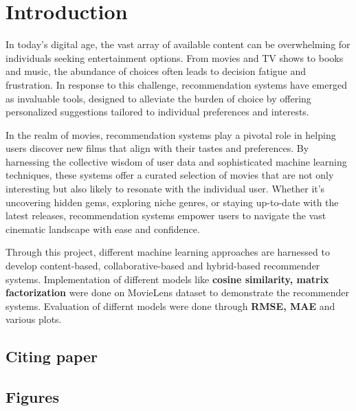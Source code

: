 \documentclass[a4paper]{article}
\theoremstyle{plain}
\theoremstyle{definition}
\begin{document}
	\section{\LARGE Introduction}
	{ \fontsize{12}{15}\selectfont In today's digital age, the vast array of available content can be overwhelming for individuals seeking entertainment options. From movies and TV shows to books and music, the abundance of choices often leads to decision fatigue and frustration. In response to this challenge, recommendation systems have emerged as invaluable tools, designed to alleviate the burden of choice by offering personalized suggestions tailored to individual preferences and interests.

 In the realm of movies, recommendation systems play a pivotal role in helping users discover new films that align with their tastes and preferences. By harnessing the collective wisdom of user data and sophisticated machine learning techniques, these systems offer a curated selection of movies that are not only interesting but also likely to resonate with the individual user. Whether it's uncovering hidden gems, exploring niche genres, or staying up-to-date with the latest releases, recommendation systems empower users to navigate the vast cinematic landscape with ease and confidence.

 Through this project, different machine learning approaches are harnessed to develop content-based, collaborative-based and hybrid-based recommender systems. Implementation of different models like
 \textbf{cosine similarity, matrix factorization} were done on MovieLens dataset to demonstrate the recommender systems. Evaluation of differnt models were done through \textbf{RMSE, MAE} and various plots.
 }
	
	\subsection{\Large Citing paper}
 
	
    \cite{serrano_academy_2018}
    \cite{albakri2019collaborative}
    \cite{jacksonwu2019improving}
    \cite{ramyavidiyala2020how}
    \cite{sciforce2021deep}
    \cite{zhang2018deep}

 
\newpage
 \subsection{\Large Figures}
 
\end{document}
